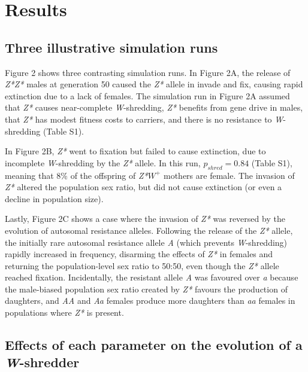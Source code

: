 \documentclass[]{rsos}%
\begin{document}
\hypertarget{results}{%
\section{Results}\label{results}}

\hypertarget{three-illustrative-simulation-runs}{%
\subsection{Three illustrative simulation
runs}\label{three-illustrative-simulation-runs}}

Figure 2 shows three contrasting simulation runs. In Figure 2A, the
release of \emph{Z*Z*} males at generation 50 caused the \emph{Z*}
allele in invade and fix, causing rapid extinction due to a lack of
females. The simulation run in Figure 2A assumed that \emph{Z*} causes
near-complete \emph{W}-shredding, \emph{Z*} benefits from gene drive in
males, that \emph{Z*} has modest fitness costs to carriers, and there is
no resistance to \emph{W}-shredding (Table S1).

In Figure 2B, \emph{Z*} went to fixation but failed to cause extinction,
due to incomplete \emph{W}-shredding by the \emph{Z*} allele. In this
run, \(p_{shred} = 0.84\) (Table S1), meaning that 8\% of the offspring
of \emph{Z*}\(W^+\) mothers are female. The invasion of \emph{Z*}
altered the population sex ratio, but did not cause extinction (or even
a decline in population size).

Lastly, Figure 2C shows a case where the invasion of \emph{Z*} was
reversed by the evolution of autosomal resistance alleles. Following the
release of the \emph{Z*} allele, the initially rare autosomal resistance
allele \emph{A} (which prevents \emph{W}-shredding) rapidly increased in
frequency, disarming the effects of \emph{Z*} in females and returning
the population-level sex ratio to 50:50, even though the \emph{Z*}
allele reached fixation. Incidentally, the resistant allele \emph{A} was
favoured over \emph{a} because the male-biased population sex ratio
created by \emph{Z*} favours the production of daughters, and \emph{AA}
and \emph{Aa} females produce more daughters than \emph{aa} females in
populations where \emph{Z*} is present.

\hypertarget{effects-of-each-parameter-on-the-evolution-of-a-w-shredder}{%
\subsection{\texorpdfstring{Effects of each parameter on the evolution
of a
\emph{W}-shredder}{Effects of each parameter on the evolution of a W-shredder}}\label{effects-of-each-parameter-on-the-evolution-of-a-w-shredder}}
\end{document}
